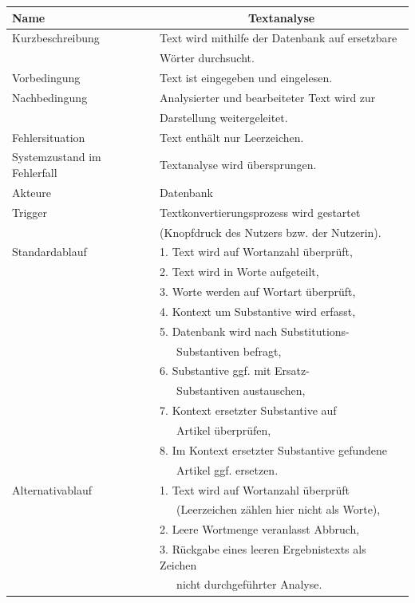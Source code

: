 \documentclass[paper=a4, parskip=half]{scrreprt}
\begin{document}
\begin{table}[htb]
\begin{tabular}{|l|l|}
\hline
Name                        & \multicolumn{1}{c|}{\textbf{Textanalyse}} \\ \hline
Kurzbeschreibung            & Text wird mithilfe der Datenbank auf ersetzbare \\
                            & Wörter durchsucht. \\ \hline
Vorbedingung                & Text ist eingegeben und eingelesen. \\ \hline
Nachbedingung               & Analysierter und bearbeiteter Text wird zur \\
                            & Darstellung weitergeleitet. \\ \hline
Fehlersituation             & Text enthält nur Leerzeichen. \\ \hline
Systemzustand im Fehlerfall & Textanalyse wird übersprungen. \\ \hline
Akteure                     & Datenbank \\ \hline
Trigger                     & Textkonvertierungsprozess wird gestartet \\
                            & (Knopfdruck des Nutzers bzw. der Nutzerin). \\ \hline
Standardablauf              & 1. Text wird auf Wortanzahl überprüft, \\ 
                            & 2. Text wird in Worte aufgeteilt, \\
                            & 3. Worte werden auf Wortart überprüft, \\
                            & 4. Kontext um Substantive wird erfasst, \\
                            & 5. Datenbank wird nach Substitutions-\\
                            &    Substantiven befragt, \\
                            & 6. Substantive ggf. mit Ersatz-\\
                            &    Substantiven austauschen, \\
                            & 7. Kontext ersetzter Substantive auf \\
                            &    Artikel überprüfen, \\
                            & 8. Im Kontext ersetzter Substantive gefundene \\
                            &    Artikel ggf. ersetzen. \\ \hline
Alternativablauf            & 1. Text wird auf Wortanzahl überprüft \\
                            &    (Leerzeichen zählen hier nicht als Worte), \\
                            & 2. Leere Wortmenge veranlasst Abbruch, \\
                            & 3. Rückgabe eines leeren Ergebnistexts als Zeichen \\
                            &    nicht durchgeführter Analyse. \\ \hline
\end{tabular}
\end{table}
\end{document}
